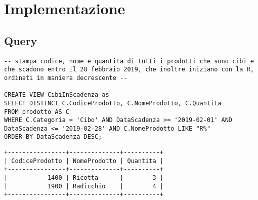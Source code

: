 \newpage
\section{Implementazione}
\subsection{Query} %
\begin{lstlisting}[title=Operazione 7, style=mysqlStyle] 
-- stampa codice, nome e quantita di tutti i prodotti che sono cibi e che scadono entro il 28 febbraio 2019, che inoltre iniziano con la R, ordinati in maniera decrescente --

CREATE VIEW CibiInScadenza as
SELECT DISTINCT C.CodiceProdotto, C.NomeProdotto, C.Quantita
FROM prodotto AS C
WHERE C.Categoria = 'Cibo' AND DataScadenza >= '2019-02-01' AND DataScadenza <= '2019-02-28' AND C.NomeProdotto LIKE "R%"
ORDER BY DataScadenza DESC;
\end{lstlisting}

\begin{lstlisting}[basicstyle=\ttfamily\footnotesize]
+----------------+--------------+----------+  
| CodiceProdotto | NomeProdotto | Quantita |  
+----------------+--------------+----------+ 
|           1400 | Ricotta      |        3 |  
|           1900 | Radicchio    |        4 |  
+----------------+--------------+----------+  
\end{lstlisting}

